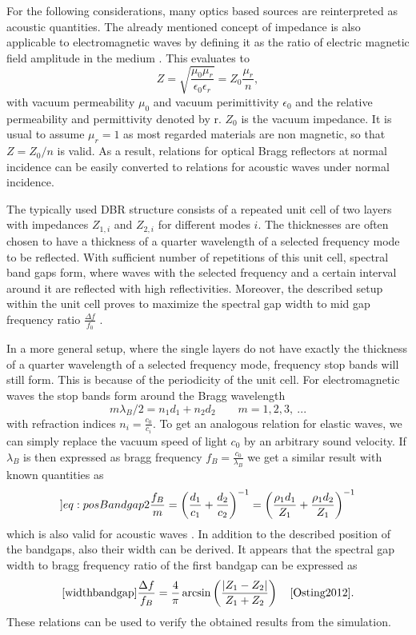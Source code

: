 For the following considerations, many optics based sources are reinterpreted
as acoustic quantities. The already mentioned concept of impedance is also
applicable to electromagnetic waves by defining it as the ratio of electric
magnetic field amplitude in the medium \cite{brekhovskikh2012waves}. This
evaluates to
\begin{equation}
    Z = \sqrt{\frac{\mu_0\mu_r}{\epsilon_0\epsilon_r}} = Z_0 \frac{\mu_r}{n},
\end{equation}
with vacuum permeability $\mu_0$ and vacuum perimittivity $\epsilon_0$ and
the relative permeability and permittivity denoted by r. $Z_0$ is the vacuum
impedance. It is usual to assume $\mu_r=1$ as most regarded materials are non
magnetic, so that $Z = Z_0/n$ is valid. As a result, relations for optical
Bragg reflectors at normal incidence can be easily converted to relations for
acoustic waves under normal incidence.

The typically used DBR structure consists of a repeated unit cell of two layers
with impedances $Z_{1,i}$ and $Z_{2,i}$ for different modes $i$. The
thicknesses are often chosen to have a thickness of a quarter wavelength
of a selected frequency mode to be reflected. With sufficient number of
repetitions of this unit cell, spectral band gaps form, where waves with the
selected frequency and a certain interval around it are reflected with high
reflectivities. Moreover, the described setup within the unit cell proves to
maximize the spectral gap width to mid gap frequency ratio
$\frac{\Delta f}{f_0}$ \cite{Osting2012}.

In a more general setup, where the single layers do not have exactly the
thickness of a quarter wavelength of a selected frequency mode, frequency 
stop bands will still form. This is because of the
periodicity of the unit cell. For electromagnetic waves the stop bands form
around the Bragg wavelength
\begin{equation}
    m\lambda_B/2 = n_1 d_1 + n_2 d_2 \quad\quad m=1,2,3,\ ...
\end{equation}
with refraction indices $n_i=\frac{c_0}{c_i}$. To get an analogous relation for
elastic waves, we can simply replace the vacuum speed of light $c_0$ by an
arbitrary sound velocity. If $\lambda_B$ is then expressed as bragg frequency
$f_B = \frac{c_0}{\lambda_B}$ we get a similar result with known quantities as
\begin{equation} \label[]{eq:posBandgap}
    2\frac{f_B}{m} = \left(\frac{d_1}{c_1}+\frac{d_2}{c_2}\right)^{-1} =
    \left(\frac{\rho_1 d_1}{Z_1}+\frac{\rho_1 d_2}{Z_1}\right)^{-1}
\end{equation}
which is also valid for acoustic waves \cite{Aliev2010}. In addition to the described position
of the bandgaps, also their width can be derived. It appears that the spectral
gap width to bragg frequency ratio of the first bandgap can be expressed as
\begin{equation} \ref{widthbandgap}
    \frac{\Delta f}{f_B} = \frac{4}{\pi} \arcsin \left(
    \frac{|Z_1-Z_2|}{Z_1+Z_2} 
    \right) \quad \text{\cite{Osting2012}}.
\end{equation}
These relations can be used to verify the obtained results from the simulation.